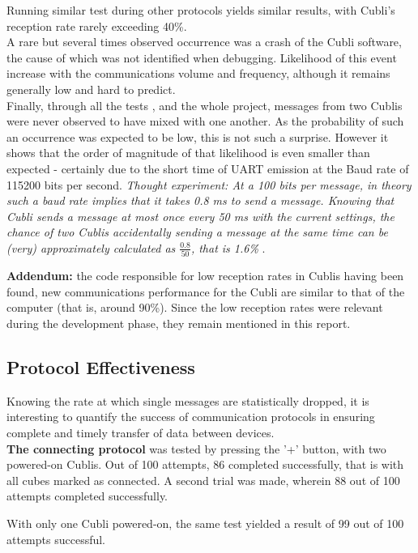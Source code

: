 Running similar test during other protocols yields similar results, with Cubli's reception rate rarely exceeding 40\%.\\

A rare but several times observed occurrence was a crash of the Cubli software, the cause of which was not identified when debugging. Likelihood of this event increase with the communications volume and frequency, although it remains generally low and hard to predict.\\

Finally, through all the tests , and the whole project, messages from two Cublis were never observed to have mixed with one another. As the probability of such an occurrence was expected to be low, this is not such a surprise. However it shows that the order of magnitude of that likelihood is even smaller than expected - certainly due to the short time of UART emission at the Baud rate of 115200 bits per second. \textit{ Thought experiment: At a 100 bits per message, in theory such a baud rate implies that it takes 0.8 ms to send a message. Knowing that Cubli sends a message at most once every 50 ms with the current settings, the chance of two Cublis accidentally sending a message at the same time can be (very) approximately calculated as $\frac{0.8}{50}$, that is 1.6\% }.

\textbf{Addendum:} the code responsible for low reception rates in Cublis having been found, new communications performance for the Cubli are similar to that of the computer (that is, around 90\%). Since the low reception rates were relevant during the development phase, they remain mentioned in this report.

\subsection{Protocol Effectiveness}

Knowing the rate at which single messages are statistically dropped, it is interesting to quantify the success of communication protocols in ensuring complete and timely transfer of data between devices. \\

\textbf{The connecting protocol} was tested by pressing the '+' button, with two powered-on Cublis. Out of 100 attempts, 86 completed successfully, that is with all cubes marked as connected. A second trial was made, wherein 88 out of 100 attempts completed successfully.

With only one Cubli powered-on, the same test yielded a result of 99 out of 100 attempts successful.\\


